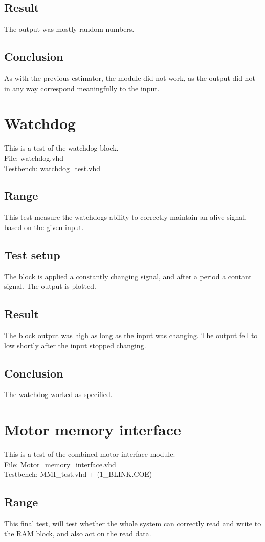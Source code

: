 \subsection{Result}
The output was mostly random numbers.
\subsection{Conclusion}
As with the previous estimator, the module did not work, as the output did not in any way correspond meaningfully to the input.

\section{Watchdog}
This is a test of the watchdog block.\\
File: watchdog.vhd\\
Testbench: watchdog\_test.vhd
\subsection{Range}
This test measure the watchdogs ability to correctly maintain an alive signal, based on the given input.
\subsection{Test setup}
The block is applied a constantly changing signal, and after a period a contant signal. The output is plotted.
\subsection{Result}
The block output was high as long as the input was changing. The output fell to low shortly after the input stopped changing.
\subsection{Conclusion}
The watchdog worked as specified.

\section{Motor memory interface}
This is a test of the combined motor interface module.\\
File: Motor\_memory\_interface.vhd\\
Testbench: MMI\_test.vhd + (1\_BLINK.COE)
\subsection{Range}
This final test, will test whether the whole system can correctly read and write to the RAM block, and also act on the read data.
